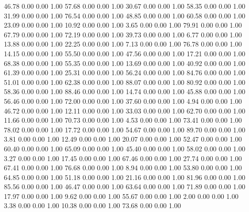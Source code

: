    46.78   0.00   0.00   1.00
   57.68   0.00   0.00   1.00
   30.67   0.00   0.00   1.00
   58.35   0.00   0.00   1.00
   31.99   0.00   0.00   1.00
   76.54   0.00   0.00   1.00
   48.85   0.00   0.00   1.00
   60.58   0.00   0.00   1.00
   23.09   0.00   0.00   1.00
   10.92   0.00   0.00   1.00
    3.65   0.00   0.00   1.00
   79.91   0.00   0.00   1.00
   67.79   0.00   0.00   1.00
   72.19   0.00   0.00   1.00
   39.73   0.00   0.00   1.00
    6.77   0.00   0.00   1.00
   13.88   0.00   0.00   1.00
   22.25   0.00   0.00   1.00
    7.13   0.00   0.00   1.00
   76.78   0.00   0.00   1.00
   14.15   0.00   0.00   1.00
   55.50   0.00   0.00   1.00
   47.56   0.00   0.00   1.00
   17.21   0.00   0.00   1.00
   68.38   0.00   0.00   1.00
   55.35   0.00   0.00   1.00
   13.69   0.00   0.00   1.00
   40.92   0.00   0.00   1.00
   61.39   0.00   0.00   1.00
   25.31   0.00   0.00   1.00
   56.24   0.00   0.00   1.00
   84.76   0.00   0.00   1.00
   51.01   0.00   0.00   1.00
   62.38   0.00   0.00   1.00
   88.07   0.00   0.00   1.00
   80.92   0.00   0.00   1.00
   58.36   0.00   0.00   1.00
   88.46   0.00   0.00   1.00
   14.74   0.00   0.00   1.00
   45.88   0.00   0.00   1.00
   56.46   0.00   0.00   1.00
   72.00   0.00   0.00   1.00
   37.60   0.00   0.00   1.00
    4.94   0.00   0.00   1.00
   46.72   0.00   0.00   1.00
   12.11   0.00   0.00   1.00
   33.03   0.00   0.00   1.00
   62.70   0.00   0.00   1.00
   11.66   0.00   0.00   1.00
   70.73   0.00   0.00   1.00
    4.53   0.00   0.00   1.00
   73.41   0.00   0.00   1.00
   78.02   0.00   0.00   1.00
   17.72   0.00   0.00   1.00
   54.67   0.00   0.00   1.00
   89.70   0.00   0.00   1.00
    3.81   0.00   0.00   1.00
   12.49   0.00   0.00   1.00
   20.07   0.00   0.00   1.00
   52.47   0.00   0.00   1.00
   60.40   0.00   0.00   1.00
   65.09   0.00   0.00   1.00
   45.40   0.00   0.00   1.00
   58.02   0.00   0.00   1.00
    3.27   0.00   0.00   1.00
   17.45   0.00   0.00   1.00
   67.46   0.00   0.00   1.00
   27.74   0.00   0.00   1.00
   67.41   0.00   0.00   1.00
   76.68   0.00   0.00   1.00
    8.94   0.00   0.00   1.00
   53.80   0.00   0.00   1.00
   64.85   0.00   0.00   1.00
   51.18   0.00   0.00   1.00
   21.16   0.00   0.00   1.00
   81.96   0.00   0.00   1.00
   85.56   0.00   0.00   1.00
   46.47   0.00   0.00   1.00
   63.64   0.00   0.00   1.00
   71.89   0.00   0.00   1.00
   17.97   0.00   0.00   1.00
    9.62   0.00   0.00   1.00
   55.67   0.00   0.00   1.00
    2.00   0.00   0.00   1.00
    3.38   0.00   0.00   1.00
   10.38   0.00   0.00   1.00
   73.68   0.00   0.00   1.00
